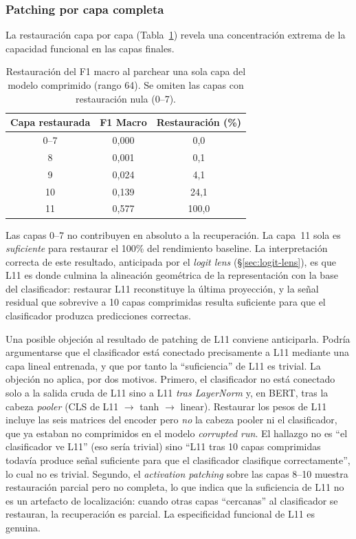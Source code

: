 \subsubsection{Patching por capa completa}

La restauración capa por capa (Tabla~\ref{tab:patching-capas}) revela
una concentración extrema de la capacidad funcional en las capas
finales.

\begin{table}[ht]
\centering
\caption{Restauración del F1 macro al parchear una sola capa del modelo
comprimido (rango 64). Se omiten las capas con restauración nula
(0--7).}
\label{tab:patching-capas}
\begin{tabular}{ccc}
\toprule
\textbf{Capa restaurada} & \textbf{F1 Macro} & \textbf{Restauración (\%)} \\
\midrule
0--7 & 0{,}000 & 0{,}0 \\
8    & 0{,}001 & 0{,}1 \\
9    & 0{,}024 & 4{,}1 \\
10   & 0{,}139 & 24{,}1 \\
11   & 0{,}577 & 100{,}0 \\
\bottomrule
\end{tabular}
\end{table}

Las capas 0--7 no contribuyen en absoluto a la recuperación. La capa~11
sola es \emph{suficiente} para restaurar el 100\% del rendimiento
baseline. La interpretación correcta de este resultado, anticipada por
el \emph{logit lens} (\S\ref{sec:logit-lens}), es que L11 es donde culmina la
alineación geométrica de la representación con la base del
clasificador: restaurar L11 reconstituye la última proyección, y la
señal residual que sobrevive a 10 capas comprimidas resulta suficiente
para que el clasificador produzca predicciones correctas.

Una posible objeción al resultado de patching de L11 conviene anticiparla.
Podría argumentarse que el clasificador está conectado precisamente a
L11 mediante una capa lineal entrenada, y que por tanto la
``suficiencia'' de L11 es trivial. La objeción no aplica, por dos motivos. Primero, el clasificador no está conectado solo a la salida
cruda de L11 sino a L11 \emph{tras LayerNorm} y, en BERT, tras la
cabeza \textit{pooler} (CLS de L11 $\rightarrow$ tanh $\rightarrow$
linear). Restaurar los pesos de L11 incluye las seis matrices del
encoder pero \emph{no} la cabeza pooler ni el clasificador, que ya
estaban no comprimidos en el modelo \textit{corrupted run}. El hallazgo
no es ``el clasificador ve L11'' (eso sería trivial) sino ``L11 tras 10 capas comprimidas todavía produce señal suficiente para que el
clasificador clasifique correctamente'', lo cual no es trivial.
Segundo, el \emph{activation patching} sobre las capas 8--10 muestra
restauración parcial pero no completa, lo que indica que la suficiencia
de L11 no es un artefacto de localización: cuando otras capas
``cercanas'' al clasificador se restauran, la recuperación es parcial.
La especificidad funcional de L11 es genuina.

